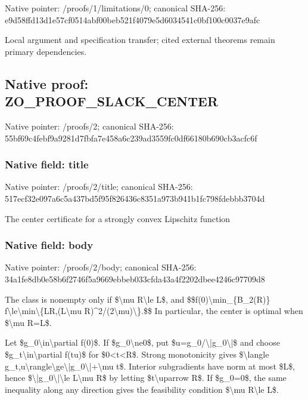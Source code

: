 \documentclass[10pt,a4paper]{article}
\begin{document}
Native pointer: /proofs/1/limitations/0; canonical SHA-256: e9d58ffd13d1e57cf0514abf\allowbreak{}00beb521f4079e5d6034541c\allowbreak{}0bf100c0037e9afc


Local argument and specification transfer; cited external theorems remain primary dependencies.


\subsection{Native proof: ZO\_PROOF\_SLACK\_CENTER}


Native pointer: /proofs/2; canonical SHA-256: 55bf69c4febf9a9281d7fbfa\allowbreak{}7e458a6c239ad3559fc0df66\allowbreak{}180b690cb3acfc6f



\subsubsection{Native field: title}


Native pointer: /proofs/2/title; canonical SHA-256: 517ecf32e097a6c5a437bd5f\allowbreak{}95f826436c8351a973b941b1\allowbreak{}fc798fdebbb3704d


The center certificate for a strongly convex Lipschitz function


\subsubsection{Native field: body}


Native pointer: /proofs/2/body; canonical SHA-256: 34a1fe8db0e58b6f2746f5a9\allowbreak{}669ebbeb033cfda43a4f2202\allowbreak{}dbee4246c97709d8


The class is nonempty only if \$\textbackslash{}mu R\textbackslash{}le L\$, and
\$\$f(0)\textbackslash{}min\_\{B\_2(R)\} f\textbackslash{}le\textbackslash{}min\textbackslash{}\{LR,(L\textbackslash{}mu R)\textasciicircum{}2/(2\textbackslash{}mu)\textbackslash{}\}.\$\$
In particular, the center is optimal when \$\textbackslash{}mu R=L\$.

Let \$g\_0\textbackslash{}in\textbackslash{}partial f(0)\$. If \$g\_0\textbackslash{}ne0\$, put \$u=g\_0/\textbackslash{}|g\_0\textbackslash{}|\$ and choose \$g\_t\textbackslash{}in\textbackslash{}partial f(tu)\$ for \$0<t<R\$. Strong monotonicity gives \$\textbackslash{}langle g\_t,u\textbackslash{}rangle\textbackslash{}ge\textbackslash{}|g\_0\textbackslash{}|+\textbackslash{}mu t\$. Interior subgradients have norm at most \$L\$, hence \$\textbackslash{}|g\_0\textbackslash{}|\textbackslash{}le L\textbackslash{}mu R\$ by letting \$t\textbackslash{}uparrow R\$. If \$g\_0=0\$, the same inequality along any direction gives the feasibility condition \$\textbackslash{}mu R\textbackslash{}le L\$.
\end{document}

